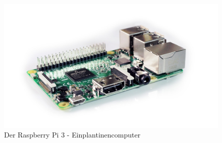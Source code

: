 \begin{figure}[H]
	\centering
	\includegraphics[width=0.8\linewidth]{bilder/raspberry-pi}
	\caption[Raspberry Pi 3 - Einplantinencomputer]{Der Raspberry Pi 3 - Einplantinencomputer \cite{PixaPi2016}}
	\label{fig:server_diagram}
\end{figure}


